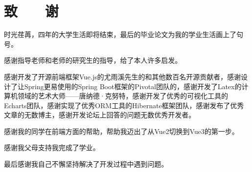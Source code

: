
\chapter*{\hfill 致　　谢 \hfill}
\linespread{1.25}

时光荏苒，四年的大学生活即将结束，最后的毕业论文为我的学业生活画上了句号。

感谢指导老师和老师的研究生的指导，给了本人许多启发。

感谢开发了开源前端框架Vue.js的尤雨溪先生的和其他数百名开源贡献者，感谢设计了让Spring更易使用的Spring Boot框架的Pivotal团队的，感谢开发了Latex的计算机领域的艺术大师——唐纳德·克努特，感谢开发了优秀的可视化工具的Echarts团队，感谢实现了优秀ORM工具的Hibernate框架团队，感谢发布了优秀文章的无数博主，感谢开发论坛上回答的问题无数优秀开发者。

感谢我的同学在前端方面的帮助，帮助我迈出了从Vue2切换到Vue3的第一步。

感谢我父母支持我完成了学业。

最后感谢我自己不懈坚持解决了开发过程中遇到问题。